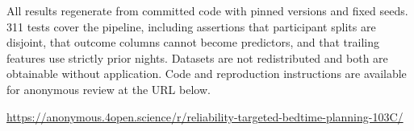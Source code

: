 \documentclass[conference,letterpaper]{IEEEtran}
\begin{document}
All results regenerate from committed code with pinned versions and fixed seeds.
311 tests cover the pipeline, including assertions that participant splits are
disjoint, that outcome columns cannot become predictors, and that trailing
features use strictly prior nights. Datasets are not redistributed and both are
obtainable without application. Code and reproduction instructions are available
for anonymous review at the URL below.

{\sloppy\par\noindent\small
\url{https://anonymous.4open.science/r/reliability-targeted-bedtime-planning-103C/}\par}
\end{document}
